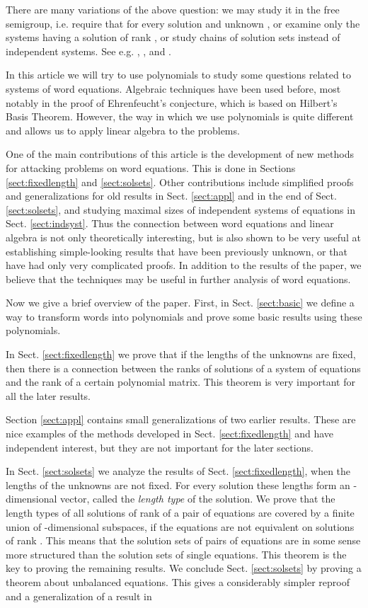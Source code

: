 \documentclass[submission]{eptcs}
\theoremstyle{definition}
\begin{document}
There are many variations of the above question: we may study it in
the free semigroup, i.e. require that  for every
solution  and unknown , or examine only the systems having a
solution of rank , or study chains of solution sets instead of
independent systems. See e.g. \cite{HaKaPl02}, \cite{HaKa04},
\cite{Cz08} and \cite{KaSa11}.

In this article we will try to use polynomials to study some
questions related to systems of word equations. Algebraic techniques
have been used before, most notably in the proof of Ehrenfeucht's
conjecture, which is based on Hilbert's Basis Theorem. However, the
way in which we use polynomials is quite different and allows us to
apply linear algebra to the problems.

One of the main contributions of this article is the development of
new methods for attacking problems on word equations. This is done
in Sections \ref{sect:fixedlength} and \ref{sect:solsets}. Other
contributions include simplified proofs and generalizations for old
results in Sect. \ref{sect:appl} and in the end of Sect.
\ref{sect:solsets}, and studying maximal sizes of independent
systems of equations in Sect. \ref{sect:indsyst}. Thus the
connection between word equations and linear algebra is not only
theoretically interesting, but is also shown to be very useful at
establishing simple-looking results that have been previously
unknown, or that have had only very complicated proofs. In addition
to the results of the paper, we believe that the techniques may be
useful in further analysis of word equations.

Now we give a brief overview of the paper. First, in Sect.
\ref{sect:basic} we define a way to transform words into polynomials
and prove some basic results using these polynomials.

In Sect. \ref{sect:fixedlength} we prove that if the lengths of the
unknowns are fixed, then there is a connection between the ranks of
solutions of a system of equations and the rank of a certain
polynomial matrix. This theorem is very important for all the later
results.

Section \ref{sect:appl} contains small generalizations of two
earlier results. These are nice examples of the methods developed in
Sect. \ref{sect:fixedlength} and have independent interest, but they
are not important for the later sections.

In Sect. \ref{sect:solsets} we analyze the results of Sect.
\ref{sect:fixedlength}, when the lengths of the unknowns are not
fixed. For every solution these lengths form an -dimensional
vector, called the \emph{length type} of the solution. We prove that
the length types of all solutions of rank  of a pair of
equations are covered by a finite union of -dimensional
subspaces, if the equations are not equivalent on solutions of rank
. This means that the solution sets of pairs of equations are
in some sense more structured than the solution sets of single
equations. This theorem is the key to proving the remaining results.
We conclude Sect. \ref{sect:solsets} by proving a theorem about
unbalanced equations. This gives a considerably simpler reproof and
a generalization of a result in \cite{HaNo03}
\end{document}
